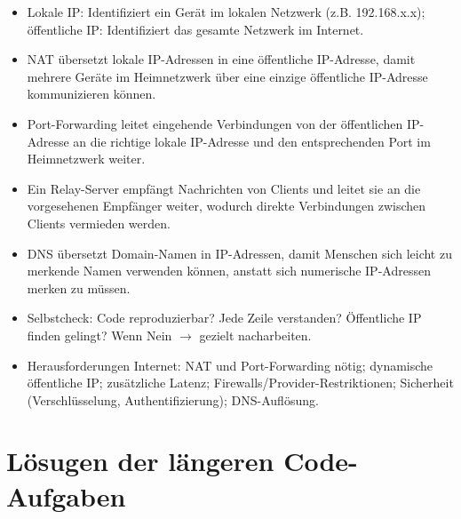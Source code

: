 \begin{myexercise}
\begin{myanswer}
        \begin{itemize}
            \item Lokale IP: Identifiziert ein Gerät im lokalen Netzwerk (z.B.      192.168.x.x); öffentliche IP: Identifiziert das gesamte Netzwerk im Internet.
            \item NAT übersetzt lokale IP-Adressen in eine öffentliche IP-Adresse, damit mehrere Geräte im Heimnetzwerk über eine einzige öffentliche IP-Adresse kommunizieren können.
            \item Port-Forwarding leitet eingehende Verbindungen von der öffentlichen IP-Adresse an die richtige lokale IP-Adresse und den entsprechenden Port im Heimnetzwerk weiter.
            \item Ein Relay-Server empfängt Nachrichten von Clients und leitet sie an die vorgesehenen Empfänger weiter, wodurch direkte Verbindungen zwischen Clients vermieden werden.
            \item DNS übersetzt Domain-Namen in IP-Adressen, damit Menschen sich leicht zu merkende Namen verwenden können, anstatt sich numerische IP-Adressen merken zu müssen.
            \item Selbstcheck: Code reproduzierbar? Jede Zeile verstanden? Öffentliche IP finden gelingt? Wenn Nein $\rightarrow$ gezielt nacharbeiten.
            \item Herausforderungen Internet: NAT und Port-Forwarding nötig; dynamische öffentliche IP; zusätzliche Latenz; Firewalls/Provider-Restriktionen; Sicherheit (Verschlüsselung, Authentifizierung); DNS-Auflösung.
        \end{itemize}
    \end{myanswer}
\end{myexercise}

\clearpage
\section{Lösugen der längeren Code-Aufgaben}
\begin{myanswer}
    
    
\end{myanswer}
\newpage
\begin{myanswer}
    
    
\end{myanswer}
\newpage
\begin{myanswer}
    
    
\end{myanswer}